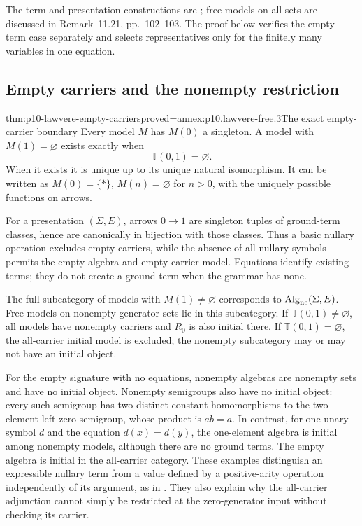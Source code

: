 The term and presentation constructions are
\cite[\S13, pp.~121--125]{AdamekRosickyVitale2010Draft}; free models on
all sets are discussed in Remark~11.21, pp.~102--103.
The proof below verifies the empty term case separately and selects
representatives only for the finitely many variables in one equation.

\subsection{Empty carriers and the nonempty restriction}
\label{sec:p10-lawvere-empty-carriers}

\begin{hbtheorem}{thm:p10-lawvere-empty-carriers}{proved=annex:p10.lawvere-free.3}{The exact empty-carrier boundary}
Every model \(M\) has \(M(0)\) a singleton.
A model with \(M(1)=\varnothing\) exists exactly when
\[
                         \mathbb T(0,1)=\varnothing.
\]
When it exists it is unique up to its unique natural isomorphism.
It can be written as \(M(0)=\{*\}\), \(M(n)=\varnothing\) for \(n>0\),
with the uniquely possible functions on arrows.

For a presentation \((\Sigma,E)\), arrows \(0\to1\) are singleton tuples
of ground-term classes, hence are canonically in bijection with those
classes.  Thus a basic nullary operation excludes empty
carriers, while the absence of all nullary symbols permits the empty
algebra and empty-carrier model.  Equations identify existing terms;
they do not create a ground term when the grammar has none.

The full subcategory of models with \(M(1)\ne\varnothing\) corresponds
to \(\operatorname{Alg}_{\rm ne}(\Sigma,E)\).
Free models on nonempty generator sets lie in this subcategory.
If \(\mathbb T(0,1)\ne\varnothing\), all models have nonempty carriers
and \(R_0\) is also initial there.
If \(\mathbb T(0,1)=\varnothing\), the all-carrier initial model is
excluded; the nonempty subcategory may or may not have an initial object.
\end{hbtheorem}

For the empty signature with no equations, nonempty algebras are
nonempty sets and have no initial object.  Nonempty semigroups also
have no initial object: every such semigroup has two distinct constant
homomorphisms to the two-element left-zero semigroup, whose product is
\(a b=a\).
In contrast, for one unary symbol \(d\) and the equation
\(d(x)=d(y)\), the one-element algebra is initial among nonempty models,
although there are no ground terms.  The empty algebra is initial in
the all-carrier category.
These examples distinguish an expressible nullary term from a value
defined by a positive-arity operation independently of its argument,
as in \cite[1963 thesis, Chapter~II, \S1, p.~64]{Lawvere2004FunctorialReprint}.
They also explain why the all-carrier adjunction cannot simply be
restricted at the zero-generator input without checking its carrier.
